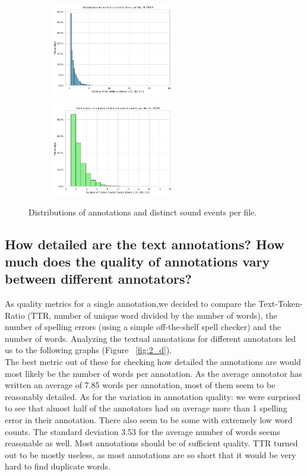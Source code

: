 \begin{figure}[htbp]
  \centering
  \begin{subfigure}[b]{0.49\textwidth}
    \includegraphics[width=\textwidth, height=4cm]{figs/annotation_dist.png}
  \end{subfigure}
  \hfill
  \begin{subfigure}[b]{0.49\textwidth}
    \includegraphics[width=\textwidth, height=4cm]{figs/sound_event_dist.png}
  \end{subfigure}
  \caption{Distributions of annotations and distinct sound events per file.}
  \label{fig:2_c}
\end{figure}

\subsection{How detailed are the text annotations? How much does the quality of annotations vary between
different annotators?}
\label{sec:Annotation Quality:b2}
As quality metrics for a single annotation,we decided to compare the Text-Token-Ratio (TTR, number of unique word divided by the number of words), the number of spelling errors (using a simple off-the-shelf spell checker) and the number of words. Analyzing the textual annotations for different annotators led us to the following graphs (Figure ~\ref{fig:2_d}). \\
The best metric out of these for checking how detailed the annotations are would most likely be the number of words per annotation. As the average annotator has written an average of 7.85 words per annotation, most of them seem to be reasonably detailed.
As for the variation in annotation quality: we were surprised to see that almost half of the annotators had on average more than 1 spelling error in their annotation. There also seem to be some with extremely low word counts. The standard deviation 3.53 for the average number of words seems reasonable as well. Most annotations should be of sufficient quality.
TTR turned out to be mostly useless, as most annotations are so short that it would be very hard to find duplicate words.

